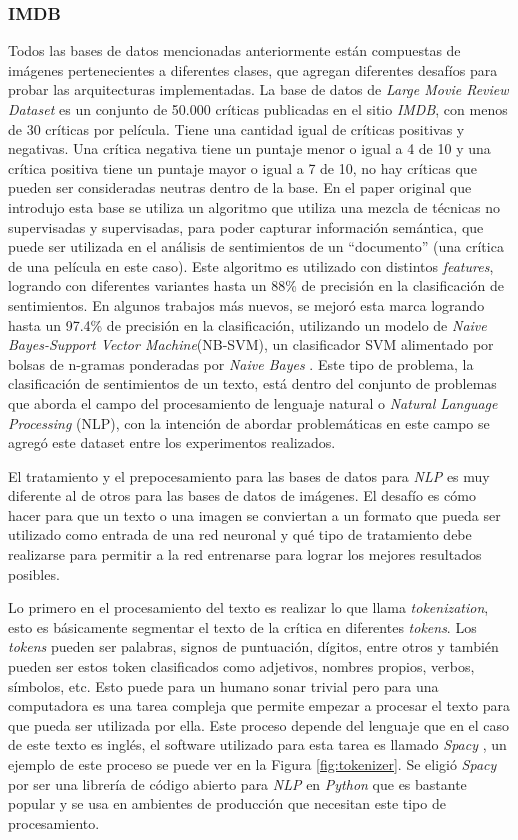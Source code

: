 \documentclass[spanish]{article}
\theoremstyle{definition}
\theoremstyle{remark}
\numberwithin{equation}{section}
\numberwithin{equation}{section} %
\begin{document}
\subsubsection{IMDB}
Todos las bases de datos mencionadas anteriormente están compuestas de imágenes pertenecientes a diferentes clases, que agregan diferentes desafíos para probar las arquitecturas implementadas. La base de datos de \textit{Large Movie Review Dataset} \cite{maas2011learning} es un conjunto de 50.000 críticas publicadas en el sitio \textit{IMDB}, con menos de 30 críticas por película. Tiene una cantidad igual de críticas positivas y negativas. Una crítica negativa tiene un puntaje menor o igual a 4 de 10 y una crítica positiva tiene un puntaje mayor o igual a 7 de 10, no hay críticas que pueden ser consideradas neutras dentro de la base. En el paper original que introdujo esta base \cite{maas2011learning} se utiliza un algoritmo que utiliza una mezcla de técnicas no supervisadas y supervisadas, para poder capturar información semántica, que puede ser utilizada en el análisis de sentimientos de un ``documento'' (una crítica de una película en este caso). Este algoritmo es utilizado con distintos \textit{features}, logrando con diferentes variantes hasta un 88\% de precisión en la clasificación de sentimientos. En algunos trabajos más nuevos, se mejoró esta marca logrando hasta un 97.4\% de precisión en la clasificación, utilizando un modelo de \textit{Naive Bayes-Support Vector Machine}(NB-SVM), un clasificador SVM alimentado por bolsas de n-gramas ponderadas por \textit{Naive Bayes} \cite{thongtan2019sentiment}. Este tipo de problema, la clasificación de sentimientos de un texto, está dentro del conjunto de problemas que aborda el campo del procesamiento de lenguaje natural o \textit{Natural Language Processing} (NLP), con la intención de abordar problemáticas en este campo se agregó este dataset entre los experimentos realizados.      
 \par
 El tratamiento y el prepocesamiento para las bases de datos para \textit{NLP} es muy diferente al de otros para las bases de datos de imágenes. El desafío es cómo hacer para que un texto o una imagen se conviertan a un formato que pueda ser utilizado como entrada de una red neuronal y qué tipo de tratamiento debe realizarse para permitir a la red entrenarse para lograr los mejores resultados posibles. 
 \par
Lo primero en el procesamiento del texto es realizar lo que llama \textit{tokenization}, esto es básicamente segmentar el texto de la crítica en diferentes \textit{tokens}. Los \textit{tokens} pueden ser palabras, signos de puntuación, dígitos, entre otros y también pueden ser estos token clasificados como adjetivos, nombres propios, verbos, símbolos, etc. Esto puede para un humano sonar trivial pero para una computadora es una tarea compleja que permite empezar a procesar el texto para que pueda ser utilizada por ella. Este proceso depende del lenguaje que en el caso de este texto es inglés, el software utilizado para esta tarea es llamado \textit{Spacy} \cite{spacy2}, un ejemplo de este proceso se puede ver en la Figura \ref{fig:tokenizer}. Se eligió \textit{Spacy} por ser una librería de código abierto para \textit{NLP} en \textit{Python} que es bastante popular y se usa en ambientes de producción que necesitan este tipo de procesamiento.
\end{document}
